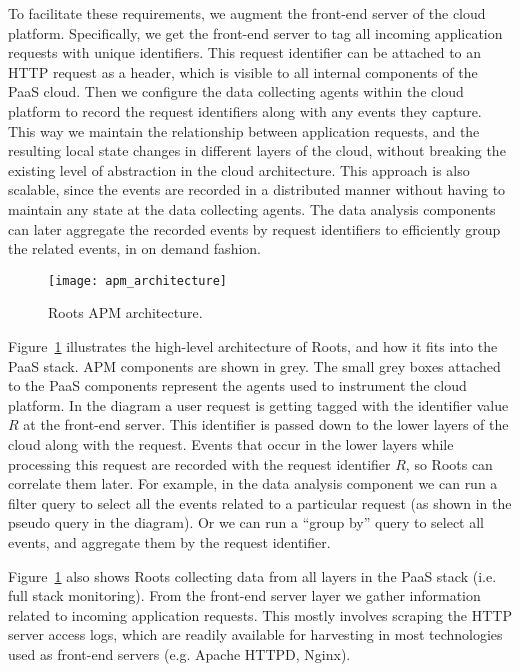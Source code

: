 To facilitate these requirements, we augment the front-end server of the cloud platform. 
Specifically, we get the front-end server to tag all incoming application requests with unique identifiers.
This request identifier can be attached to an HTTP request as a header, which is visible to all 
internal components of the PaaS cloud. Then we configure the data collecting agents within the 
cloud platform to record the request identifiers along with any events they capture. 
This way we maintain the relationship between application requests, and the resulting
local state changes in different layers of the cloud, without breaking the existing level
of abstraction in the cloud architecture. This approach is also scalable, since the events are
recorded in a distributed manner without having to maintain any state at the data collecting agents. 
The data analysis components can later
aggregate the recorded events by request identifiers to efficiently group the related events,
in on demand fashion.

\begin{figure}
\centering
\texttt{[image: apm\_architecture]}
\caption{Roots APM architecture.}
\label{fig:apm_architecture}
\end{figure}

Figure~\ref{fig:apm_architecture} illustrates the high-level architecture of Roots, and how 
it fits into the PaaS stack. APM components are shown in grey. 
The small grey boxes attached to the PaaS components represent the
agents used to instrument the cloud platform. 
In the diagram a user request is getting tagged with the identifier value
$R$ at the front-end server. This identifier is passed down to the lower layers of the cloud
along with the request. Events that occur in the lower layers while processing this request
are recorded with the request identifier $R$, so Roots can correlate them later. For example, in the 
data analysis component we can run a filter query to select all the events related to a particular
request (as shown in the pseudo query in the diagram). Or we can run a ``group by'' 
query to select all events, and aggregate them by the request identifier.

Figure~\ref{fig:apm_architecture} also shows Roots collecting data from all layers in the 
PaaS stack (i.e. full stack monitoring). 
From the front-end server layer we gather information related to incoming application
requests. This mostly involves scraping the HTTP server access logs, which are
readily available for harvesting in most technologies used as front-end
servers (e.g. Apache HTTPD, Nginx). 

